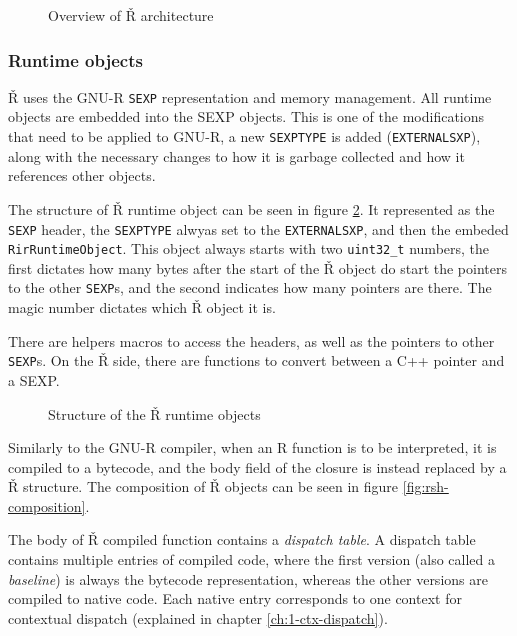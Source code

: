 \begin{figure}
	\centering
	\caption{Overview of Ř architecture\cite{reusing-jit}}\label{fig:rsh-archit}
\end{figure}

\subsubsection*{Runtime objects}
Ř uses the GNU-R \texttt{SEXP} representation and memory management. All runtime objects are embedded into the SEXP objects. This is one of the modifications that need to be applied to GNU-R, a new \texttt{SEXPTYPE} is added (\texttt{EXTERNALSXP}), along with the necessary changes to how it is garbage collected and how it references other objects.

The structure of Ř runtime object can be seen in figure \ref{fig:rsh-object-struct}. It represented as the \texttt{SEXP} header, the \texttt{SEXPTYPE} alwyas set to the \texttt{EXTERNALSXP}, and then the embeded \texttt{RirRuntimeObject}. This object always starts with two \texttt{uint32\_t} numbers, the first dictates how many bytes after the start of the Ř object do start the pointers to the other \texttt{SEXP}s, and the second indicates how many pointers are there. The magic number dictates which Ř object it is.

There are helpers macros to access the headers, as well as the pointers to other \texttt{SEXP}s. On the Ř side, there are functions to convert between a C++ pointer and a SEXP.

\begin{figure}
	\centering
	\begin{adjustbox}{trim=10 80pt 0 0, clip}
	\end{adjustbox}
	\caption{Structure of the Ř runtime objects}\label{fig:rsh-object-struct}
\end{figure}

Similarly to the GNU-R compiler, when an R function is to be interpreted, it is compiled to a bytecode, and the body field of the closure is instead replaced by a Ř structure. The composition of Ř objects can be seen in figure \ref{fig:rsh-composition}.

The body of Ř compiled function contains a \textit{dispatch table}. A dispatch table contains multiple entries of compiled code, where the first version (also called a \textit{baseline}) is always the bytecode representation, whereas the other versions are compiled to native code. Each native entry corresponds to one context for contextual dispatch (explained in chapter \ref{ch:1-ctx-dispatch}).

